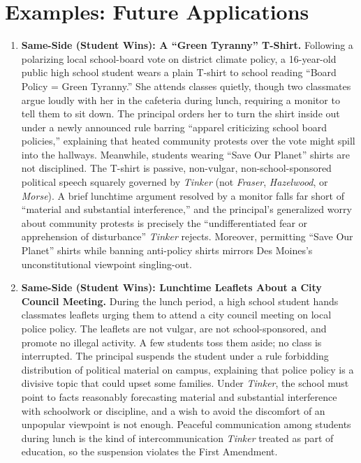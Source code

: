 \documentclass[12pt]{article}
\begin{document}
\section{Examples: Future Applications}
\begin{enumerate}

\item \textbf{Same-Side (Student Wins): A ``Green Tyranny'' T-Shirt.} Following a polarizing local school-board vote on district climate policy, a 16-year-old public high school student wears a plain T-shirt to school reading ``Board Policy = Green Tyranny.'' She attends classes quietly, though two classmates argue loudly with her in the cafeteria during lunch, requiring a monitor to tell them to sit down. The principal orders her to turn the shirt inside out under a newly announced rule barring ``apparel criticizing school board policies,'' explaining that heated community protests over the vote might spill into the hallways. Meanwhile, students wearing ``Save Our Planet'' shirts are not disciplined. The T-shirt is passive, non-vulgar, non-school-sponsored political speech squarely governed by \textit{Tinker} (not \textit{Fraser}, \textit{Hazelwood}, or \textit{Morse}). A brief lunchtime argument resolved by a monitor falls far short of ``material and substantial interference,'' and the principal's generalized worry about community protests is precisely the ``undifferentiated fear or apprehension of disturbance'' \textit{Tinker} rejects. Moreover, permitting ``Save Our Planet'' shirts while banning anti-policy shirts mirrors Des Moines's unconstitutional viewpoint singling-out.

\item \textbf{Same-Side (Student Wins): Lunchtime Leaflets About a City Council Meeting.} During the lunch period, a high school student hands classmates leaflets urging them to attend a city council meeting on local police policy. The leaflets are not vulgar, are not school-sponsored, and promote no illegal activity. A few students toss them aside; no class is interrupted. The principal suspends the student under a rule forbidding distribution of political material on campus, explaining that police policy is a divisive topic that could upset some families. Under \textit{Tinker}, the school must point to facts reasonably forecasting material and substantial interference with schoolwork or discipline, and a wish to avoid the discomfort of an unpopular viewpoint is not enough. Peaceful communication among students during lunch is the kind of intercommunication \textit{Tinker} treated as part of education, so the suspension violates the First Amendment.


\end{enumerate}
\end{document}
